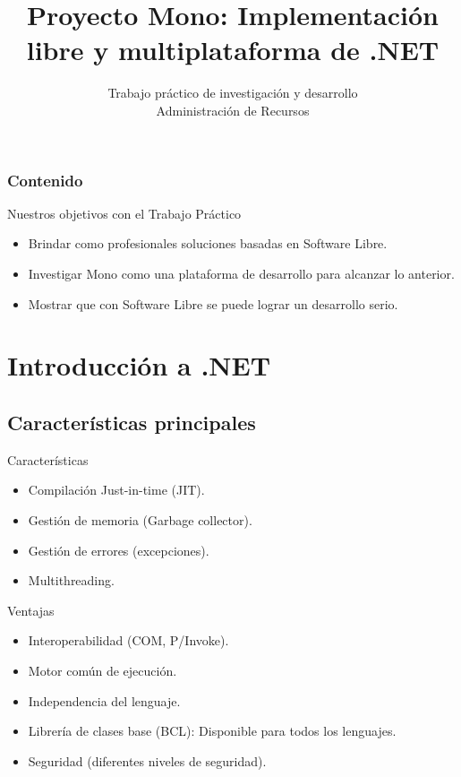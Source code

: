 \documentclass{beamer}
\title[Proyecto Mono]
{Proyecto Mono: Implementación libre y multiplataforma de .NET}
\date[TP Adm. de Recursos]
{Trabajo práctico de investigación y desarrollo \\ Administración de Recursos}
\begin{document}
\begin{frame}
  \titlepage
\end{frame}

\begin{frame}
  \frametitle{Contenido}
  \begin{scriptsize}
  \tableofcontents
  \end{scriptsize}
\end{frame}

\begin{frame}{Nuestros objetivos con el Trabajo Práctico}
  \begin{itemize}
    \item Brindar como profesionales soluciones basadas en Software Libre.
    \item Investigar Mono como una plataforma de desarrollo para alcanzar lo anterior.
    \item Mostrar que con Software Libre se puede lograr un desarrollo serio.
  \end{itemize}
\end{frame}


\section{Introducción a .NET}

\subsection{Características principales}

\begin{frame}{Características}
  \begin{itemize}
    \item Compilación Just-in-time (JIT).
    \item Gestión de memoria (Garbage collector).
    \item Gestión de errores (excepciones).
    \item Multithreading.
  \end{itemize}
\end{frame}

\begin{frame}{Ventajas}
  \begin{itemize}
    \item Interoperabilidad (COM, P/Invoke).
    \item Motor común de ejecución. %
    \item Independencia del lenguaje.
    \item Librería de clases base (BCL): Disponible para todos los lenguajes.
    \item Seguridad (diferentes niveles de seguridad).
  \end{itemize}
\end{frame}
\end{document}
